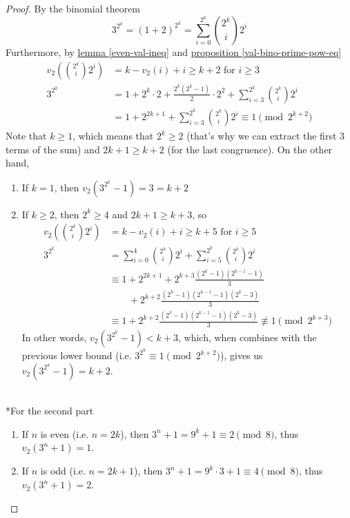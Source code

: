 \documentclass{treatise}
\begin{document}
\begin{proof}
By the binomial theorem
$$3^{2^k} = (1 + 2)^{2^k} = \sum_{i = 0}^{2^k} {2^k \choose i} 2^i$$
Furthermore, by \hyperref[even-val-ineq]{lemma \ref*{even-val-ineq}} and \hyperref[val-bino-prime-pow-eq]{proposition \ref*{val-bino-prime-pow-eq}}
\begin{align*}
v_2 \left( {2^k \choose i} 2^i \right) & = k - v_2 (i) + i \geq k + 2 \mbox{ for } i \geq 3
\\
3^{2^k} & = 1 + 2^k \cdot 2 + \frac{2^k (2^k - 1)}{2} \cdot 2^2 + \sum_{i = 3}^{2^k} {2^k \choose i} 2^i
\\
& = 1 + 2^{2k + 1} + \sum_{i = 3}^{2^k} {2^k \choose i} 2^i \equiv 1 \pmod{2^{k + 2}}
\end{align*}
Note that $k \geq 1$, which means that $2^k \geq 2$ (that's why we can extract the first 3 terms of the sum) and $2k + 1 \geq k + 2$ (for the last congruence). On the other hand,
\begin{enumerate}
	\item If $k = 1$, then $v_2 (3^{2^k} - 1) = 3 = k + 2$
	\item If $k \geq 2$, then $2^k \geq 4$ and $2k + 1 \geq k + 3$, so
	\begin{align*}
	v_2 \left( {2^k \choose i} 2^i \right) & = k - v_2 (i) + i \geq k + 5 \mbox{ for } i \geq 5
	\\
	3^{2^k} & = \sum_{i = 0}^{4} {2^k \choose i} 2^i + \sum_{i = 5}^{2^k} {2^k \choose i} 2^i
	\\
	& \equiv 1 + 2^{2k + 1} + 2^{k + 3} \frac{(2^k - 1)(2^{k - 1} - 1)}{3}
	\\
	& \qquad + 2^{k + 2} \frac{(2^k - 1) (2^{k - 1} - 1) (2^k - 3)}{3}
	\\
	& \equiv 1 + 2^{k + 2} \frac{(2^k - 1) (2^{k - 1} - 1) (2^k - 3)}{3} \not\equiv 1 \pmod{2^{k + 3}}
	\end{align*}
	In other words, $v_2 (3^{2^k} - 1) < k + 3$, which, when combines with the previous lower bound (i.e. $3^{2^k} \equiv 1 \pmod{2^{k + 2}}$), gives us $v_2 (3^{2^k} - 1) = k + 2$.
\end{enumerate}
\ 
\\
*For the second part
\begin{enumerate}
	\item If $n$ is even (i.e. $n = 2k$), then $3^n + 1 = 9^k + 1 \equiv 2 \pmod{8}$, thus $v_2 (3^n + 1) = 1$.
	\item If $n$ is odd (i.e. $n = 2k + 1$), then $3^n + 1 = 9^k \cdot 3 + 1 \equiv 4 \pmod{8}$, thus $v_2 (3^n + 1) = 2$.
\end{enumerate}
\end{proof}
\end{document}
